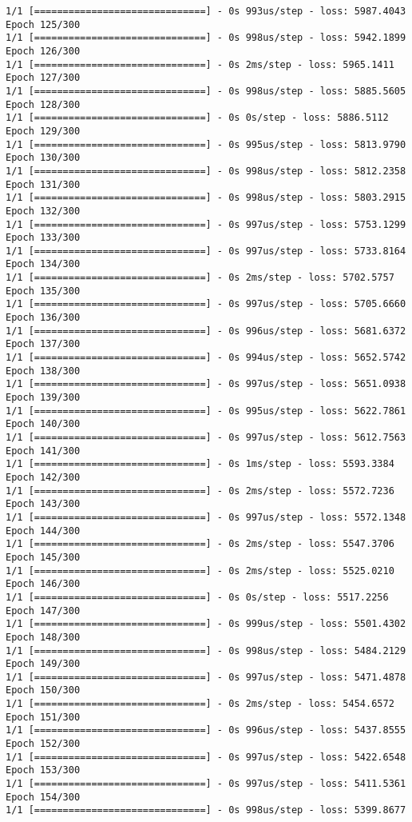 \documentclass[11pt]{article}
\begin{document}
\begin{Verbatim}[commandchars=\\\{\}]
1/1 [==============================] - 0s 993us/step - loss: 5987.4043
Epoch 125/300
1/1 [==============================] - 0s 998us/step - loss: 5942.1899
Epoch 126/300
1/1 [==============================] - 0s 2ms/step - loss: 5965.1411
Epoch 127/300
1/1 [==============================] - 0s 998us/step - loss: 5885.5605
Epoch 128/300
1/1 [==============================] - 0s 0s/step - loss: 5886.5112
Epoch 129/300
1/1 [==============================] - 0s 995us/step - loss: 5813.9790
Epoch 130/300
1/1 [==============================] - 0s 998us/step - loss: 5812.2358
Epoch 131/300
1/1 [==============================] - 0s 998us/step - loss: 5803.2915
Epoch 132/300
1/1 [==============================] - 0s 997us/step - loss: 5753.1299
Epoch 133/300
1/1 [==============================] - 0s 997us/step - loss: 5733.8164
Epoch 134/300
1/1 [==============================] - 0s 2ms/step - loss: 5702.5757
Epoch 135/300
1/1 [==============================] - 0s 997us/step - loss: 5705.6660
Epoch 136/300
1/1 [==============================] - 0s 996us/step - loss: 5681.6372
Epoch 137/300
1/1 [==============================] - 0s 994us/step - loss: 5652.5742
Epoch 138/300
1/1 [==============================] - 0s 997us/step - loss: 5651.0938
Epoch 139/300
1/1 [==============================] - 0s 995us/step - loss: 5622.7861
Epoch 140/300
1/1 [==============================] - 0s 997us/step - loss: 5612.7563
Epoch 141/300
1/1 [==============================] - 0s 1ms/step - loss: 5593.3384
Epoch 142/300
1/1 [==============================] - 0s 2ms/step - loss: 5572.7236
Epoch 143/300
1/1 [==============================] - 0s 997us/step - loss: 5572.1348
Epoch 144/300
1/1 [==============================] - 0s 2ms/step - loss: 5547.3706
Epoch 145/300
1/1 [==============================] - 0s 2ms/step - loss: 5525.0210
Epoch 146/300
1/1 [==============================] - 0s 0s/step - loss: 5517.2256
Epoch 147/300
1/1 [==============================] - 0s 999us/step - loss: 5501.4302
Epoch 148/300
1/1 [==============================] - 0s 998us/step - loss: 5484.2129
Epoch 149/300
1/1 [==============================] - 0s 997us/step - loss: 5471.4878
Epoch 150/300
1/1 [==============================] - 0s 2ms/step - loss: 5454.6572
Epoch 151/300
1/1 [==============================] - 0s 996us/step - loss: 5437.8555
Epoch 152/300
1/1 [==============================] - 0s 997us/step - loss: 5422.6548
Epoch 153/300
1/1 [==============================] - 0s 997us/step - loss: 5411.5361
Epoch 154/300
1/1 [==============================] - 0s 998us/step - loss: 5399.8677

\end{Verbatim}
\end{document}
